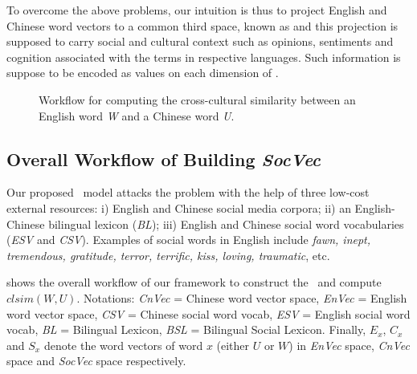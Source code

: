 To overcome the above problems, our intuition is thus 
to project English and Chinese word vectors to a common third space, 
known as \textit{\socvec} and this projection is supposed to carry 
social and cultural context such as opinions, sentiments and cognition 
associated with the terms in respective languages. 
Such information is suppose to be encoded as values on each 
dimension of \textit{\socvec}.
%
\begin{figure}[th!]
	\centering
	\caption{Workflow for computing the cross-cultural similarity between 
an English word \textit{W} and a Chinese word \textit{U}.}
	\label{fig:overview}
\end{figure}
\vspace{-15pt}
\subsection{Overall Workflow of Building \textit{SocVec}}
Our proposed \textit{\socvec}~model attacks the problem with the help of three low-cost external resources: 
i) English and Chinese social media corpora; ii) an English-Chinese bilingual lexicon (\textit{BL});  
iii) English and Chinese social word vocabularies 
(\textit{ESV} and \textit{CSV}).
Examples of social words in English include
\textit{fawn, inept, tremendous, gratitude,
terror, terrific, kiss, loving, traumatic}, etc.

 shows the overall workflow of our framework to construct the \textit{\socvec}~and compute $clsim(W,U)$. 
Notations: \textit{CnVec} = Chinese word vector space, \textit{EnVec} = English word vector space,
\textit{CSV} = Chinese social word vocab, \textit{ESV} = English social word vocab,
\textit{BL} = Bilingual Lexicon, \textit{BSL} = Bilingual Social Lexicon. 
Finally, $E_x$, $C_x$ and $S_x$ denote the word vectors of word $x$ (either $U$ or $W$) in \textit{EnVec} space, \textit{CnVec} space and \textit{SocVec} space respectively.  

